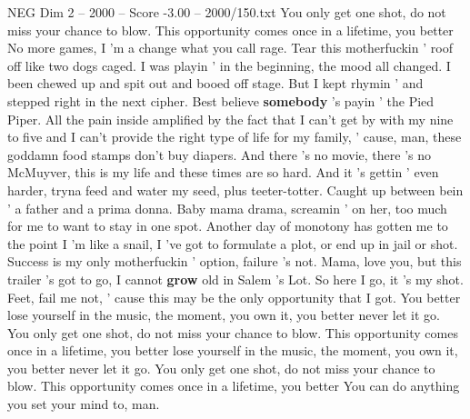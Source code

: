 \begin{textsample}{NEG Dim 2 – 2000 – Score -3.00 – 2000/150.txt}
You only get one shot, do not miss your chance to blow.
This opportunity comes once in a lifetime, you better No more games, I 'm a change what you call rage.
Tear this motherfuckin ' roof off like two dogs caged.
I was playin ' in the beginning, the mood all changed.
I been chewed up and spit out and booed off stage.
But I kept rhymin ' and stepped right in the next cipher.
Best believe \textbf{somebody} 's payin ' the Pied Piper.
All the pain inside amplified by the fact that I can't get by with my nine to five and I can't provide the right type of life for my family, ' cause, man, these goddamn food stamps don't buy diapers.
And there 's no movie, there 's no McMuyver, this is my life and these times are so hard.
And it 's gettin ' even harder, tryna feed and water my seed, plus teeter-totter.
Caught up between bein ' a father and a prima donna.
Baby mama drama, screamin ' on her, too much for me to want to stay in one spot.
Another day of monotony has gotten me to the point I 'm like a snail, I 've got to formulate a plot, or end up in jail or shot.
Success is my only motherfuckin ' option, failure 's not.
Mama, love you, but this trailer 's got to go, I cannot \textbf{grow} old in Salem 's Lot.
So here I go, it 's my shot.
Feet, fail me not, ' cause this may be the only opportunity that I got.
You better lose yourself in the music, the moment, you own it, you better never let it go.
You only get one shot, do not miss your chance to blow.
This opportunity comes once in a lifetime, you better lose yourself in the music, the moment, you own it, you better never let it go.
You only get one shot, do not miss your chance to blow.
This opportunity comes once in a lifetime, you better You can do anything you set your mind to, man.

\end{textsample}
